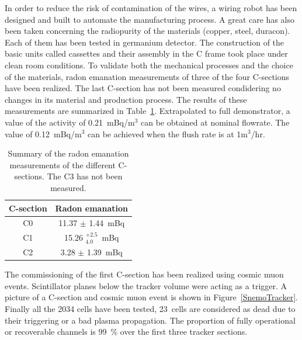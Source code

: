 \documentclass[main.tex]{subfiles}
\begin{document}
\bigskip




\NI In order to reduce the risk of contamination of the wires, a wiring robot has been designed and built to automate the manufacturing process. A great care has also been taken concerning the radiopurity of the materials (copper, steel, duracon). Each of them has been tested in germanium detector. The construction of the basic units called cassettes and their assembly in the C frame took place under clean room conditions. To validate both the mechanical processes and the choice of the materials, radon emanation measurements of three of the four C-sections have been realized. The last C-section has not been measured condidering no changes in its material and production process. The results of these measurements are summarized in Table~\ref{tab:RadonEmanation}. Extrapolated to full demonstrator, a value of the activity of 0.21~mBq/m$^{\text{3}}$ can be obtained at nominal flowrate. The value of 0.12~mBq/m$^{\text{3}}$ can be achieved when the flush rate is at 1m$^{\text{3}}$/hr.


\begin{table}[h!]
\centering
\begin{tabular}{c|c}
\toprule
C-section & Radon emanation \\
\hline	
C0 & 11.37 $\pm$ 1.44~mBq \\
C1 & 15.26 $^{+\text{2.5}}_{\text{4.0}}$~mBq \\
C2 & 3.28 $\pm$ 1.39~mBq \\
\bottomrule
\end{tabular}
\caption{Summary of the radon emanation measurements of the different C-sections. The C3 has not been measured.}
\label{tab:RadonEmanation}
\end{table}


\bigskip


\NI The commissioning of the first C-section has been realized using cosmic muon events. Scintillator planes below the tracker volume were acting as a trigger. A picture of a C-section and cosmic muon event is shown in Figure~\ref{SnemoTracker}. Finally all the 2034 cells have been tested, 23~cells are considered as dead due to their triggering or a bad plasma propagation. The proportion of fully operational or recoverable channels is 99~\% over the first three tracker sections. 
\end{document}
